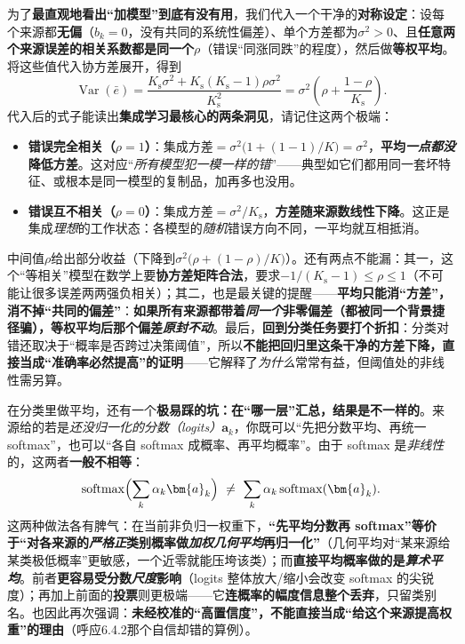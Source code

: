 为了\textbf{最直观地看出“加模型”到底有没有用}，我们代入一个干净的\textbf{对称设定}：设每个来源都\textbf{无偏}（$b_k=0$，没有共同的系统性偏差）、单个方差都为$\sigma^2>0$、且\textbf{任意两个来源误差的相关系数都是同一个}$\rho$（错误“同涨同跌”的程度），然后做\textbf{等权平均}。将这些值代入协方差展开，得到
\begin{equation}
  \operatorname{Var}(\bar e)
  =\frac{K_{\mathrm{s}}\sigma^2+K_{\mathrm{s}}(K_{\mathrm{s}}-1)\rho\sigma^2}{K_{\mathrm{s}}^2}
  =\sigma^2\left(\rho+\frac{1-\rho}{K_{\mathrm{s}}}\right).
  \label{eq:ket-integration-equal-correlation}
\end{equation}
代入后的式子能读出\textbf{集成学习最核心的两条洞见}，请记住这两个极端：
\begin{itemize}\item \textbf{错误完全相关（$\rho=1$）}：集成方差$=\sigma^2\bigl(1+(1-1)/K\bigr)=\sigma^2$，\textbf{平均\emph{一点都没}降低方差}。这对应“\emph{所有模型犯一模一样的错}”——典型如它们都用同一套坏特征、或根本是同一模型的复制品，加再多也没用。\item \textbf{错误互不相关（$\rho=0$）}：集成方差$=\sigma^2/K_{\mathrm{s}}$，\textbf{方差随来源数线性下降}。这正是集成\emph{理想}的工作状态：各模型的\emph{随机}错误方向不同，一平均就互相抵消。\end{itemize}
中间值$\rho$给出部分收益（下降到$\sigma^2\bigl(\rho+(1-\rho)/K\bigr)$）。还有两点不能漏：其一，这个“等相关”模型在数学上要\textbf{协方差矩阵合法}，要求$-1/(K_{\mathrm{s}}-1)\leq\rho\leq1$（不可能让很多误差两两强负相关）；其二，也是最关键的提醒——\textbf{平均只能消“方差”，消不掉“共同的偏差”}：\textbf{如果所有来源都带着\emph{同一个}非零偏差（都被同一个背景捷径骗），等权平均后那个偏差\emph{原封不动}}。最后，\textbf{回到分类任务要打个折扣}：分类对错还取决于“概率是否跨过决策阈值”，所以\textbf{不能把回归里这条干净的方差下降，直接当成“准确率必然提高”的证明}——它解释了\emph{为什么}常常有益，但阈值处的非线性需另算。

在分类里做平均，还有一个\textbf{极易踩的坑：在“哪一层”汇总，结果是不一样的}。来源给的若是\emph{还没归一化的分数（logits）}$\bm{a}_k$，你既可以“先把分数平均、再统一 softmax”，也可以“各自 softmax 成概率、再平均概率”。由于 softmax 是\emph{非线性}的，这两者\textbf{一般不相等}：
$$\operatorname{softmax}\Bigl(\sum_k\alpha_k\bm{a}_k\Bigr)\ \ne\ \sum_k\alpha_k\operatorname{softmax}(\bm{a}_k).$$这两种做法各有脾气：在当前非负归一权重下，\textbf{“先平均分数再 softmax”等价于“对各来源的\emph{严格正}类别概率做\emph{加权几何平均}再归一化”}（几何平均对“某来源给某类极低概率”更敏感，一个近零就能压垮该类）；而\textbf{直接平均概率做的是\emph{算术平均}}。前者\textbf{更容易受分数\emph{尺度}影响}（logits 整体放大/缩小会改变 softmax 的尖锐度）；再加上前面的\textbf{投票}则更极端——它\textbf{连概率的幅度信息整个丢弃}，只留类别名。也因此再次强调：\textbf{未经校准的“高置信度”，不能直接当成“给这个来源提高权重”的理由}（呼应6.4.2那个自信却错的算例）。

